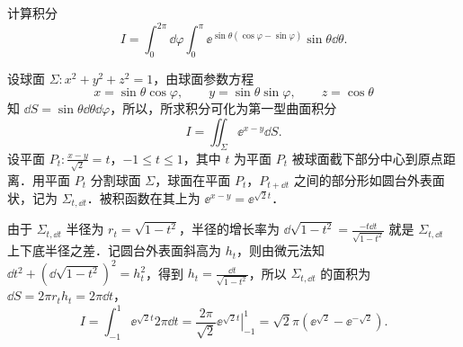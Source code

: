 计算积分
\[
  I=\int_0^{2\pi}\dd\varphi\int_0^{\pi}\ee^{\sin\theta(\cos\varphi-\sin\varphi)}\sin\theta\dd\theta.
\]
\begin{solution}
设球面 $\Sigma:x^2+y^2+z^2=1$，由球面参数方程
\[
x=\sin\theta\cos\varphi,\qquad y=\sin\theta\sin\varphi,\qquad z=\cos\theta
\]
知 $\dd S=\sin\theta\dd\theta\dd\varphi$，所以，所求积分可化为第一型曲面积分
\[
I=\iint_{\Sigma}\ee^{x-y}\dd S.
\]
设平面 $P_t:\frac{x-y}{\sqrt2}=t$，$-1\le t\le1$，其中 $t$ 为平面 $P_t$ 被球面截下部分中心到原点距离．用平面 $P_t$ 分割球面 $\Sigma$，球面在平面 $P_t$，$P_{t+\dd t}$ 之间的部分形如圆台外表面状，记为 $\Sigma_{t,\dd t}$．被积函数在其上为 $\ee^{x-y}=\ee^{\sqrt2t}$．

由于 $\Sigma_{t,\dd t}$ 半径为 $r_t=\sqrt{1-t^2}$，半径的增长率为 $\dd\sqrt{1-t^2}=\frac{-t\dd t}{\sqrt{1-t^2}}$ 就是 $\Sigma_{t,\dd t}$ 上下底半径之差．记圆台外表面斜高为 $h_t$，则由微元法知 $\dd t^2+\left(\dd\sqrt{1-t^2}\right)^2=h_t^2$，得到 $h_t=\frac{\dd t}{\sqrt{1-t^2}}$，所以 $\Sigma_{t,\dd t}$ 的面积为 $\dd S=2\pi r_th_t=2\pi\dd t$，
\[
I=\int_{-1}^{1}\ee^{\sqrt2t}2\pi\dd t=\frac{2\pi}{\sqrt2}\left.\ee^{\sqrt2t}\right|_{-1}^{1}
=\sqrt2\pi\left(\ee^{\sqrt2}-\ee^{-\sqrt2}\right).
\]
\end{solution}

